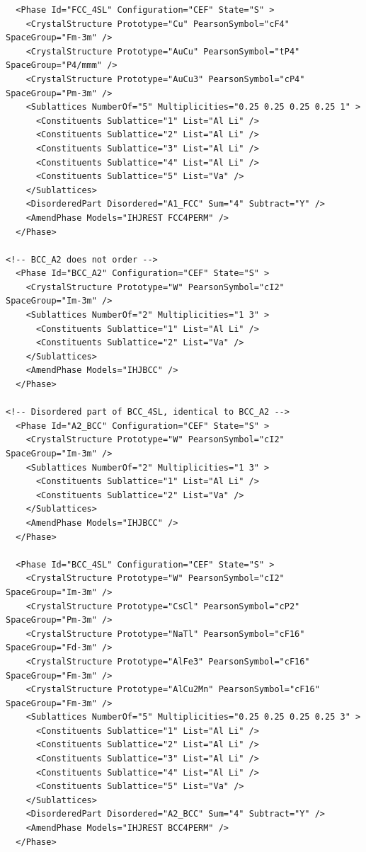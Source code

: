 \documentclass{article}
\begin{document}
\begin{appendices}
\begin{verbatim}
  <Phase Id="FCC_4SL" Configuration="CEF" State="S" >
	<CrystalStructure Prototype="Cu" PearsonSymbol="cF4" SpaceGroup="Fm-3m" />
	<CrystalStructure Prototype="AuCu" PearsonSymbol="tP4" SpaceGroup="P4/mmm" />
	<CrystalStructure Prototype="AuCu3" PearsonSymbol="cP4" SpaceGroup="Pm-3m" />
    <Sublattices NumberOf="5" Multiplicities="0.25 0.25 0.25 0.25 1" >
      <Constituents Sublattice="1" List="Al Li" />
      <Constituents Sublattice="2" List="Al Li" />
      <Constituents Sublattice="3" List="Al Li" />
      <Constituents Sublattice="4" List="Al Li" />
      <Constituents Sublattice="5" List="Va" />
    </Sublattices>
    <DisorderedPart Disordered="A1_FCC" Sum="4" Subtract="Y" />
    <AmendPhase Models="IHJREST FCC4PERM" />
  </Phase>

<!-- BCC_A2 does not order -->
  <Phase Id="BCC_A2" Configuration="CEF" State="S" >
	<CrystalStructure Prototype="W" PearsonSymbol="cI2" SpaceGroup="Im-3m" />
    <Sublattices NumberOf="2" Multiplicities="1 3" >
      <Constituents Sublattice="1" List="Al Li" />
      <Constituents Sublattice="2" List="Va" />
    </Sublattices>
    <AmendPhase Models="IHJBCC" />
  </Phase>

<!-- Disordered part of BCC_4SL, identical to BCC_A2 -->
  <Phase Id="A2_BCC" Configuration="CEF" State="S" >
	<CrystalStructure Prototype="W" PearsonSymbol="cI2" SpaceGroup="Im-3m" />
    <Sublattices NumberOf="2" Multiplicities="1 3" >
      <Constituents Sublattice="1" List="Al Li" />
      <Constituents Sublattice="2" List="Va" />
    </Sublattices>
    <AmendPhase Models="IHJBCC" />
  </Phase>

  <Phase Id="BCC_4SL" Configuration="CEF" State="S" >
	<CrystalStructure Prototype="W" PearsonSymbol="cI2" SpaceGroup="Im-3m" />
	<CrystalStructure Prototype="CsCl" PearsonSymbol="cP2" SpaceGroup="Pm-3m" />
	<CrystalStructure Prototype="NaTl" PearsonSymbol="cF16" SpaceGroup="Fd-3m" />
	<CrystalStructure Prototype="AlFe3" PearsonSymbol="cF16" SpaceGroup="Fm-3m" />
	<CrystalStructure Prototype="AlCu2Mn" PearsonSymbol="cF16" SpaceGroup="Fm-3m" />
    <Sublattices NumberOf="5" Multiplicities="0.25 0.25 0.25 0.25 3" >
      <Constituents Sublattice="1" List="Al Li" />
      <Constituents Sublattice="2" List="Al Li" />
      <Constituents Sublattice="3" List="Al Li" />
      <Constituents Sublattice="4" List="Al Li" />
      <Constituents Sublattice="5" List="Va" />
    </Sublattices>
    <DisorderedPart Disordered="A2_BCC" Sum="4" Subtract="Y" />
    <AmendPhase Models="IHJREST BCC4PERM" />
  </Phase>


\end{verbatim}
\end{appendices}
\end{document}
